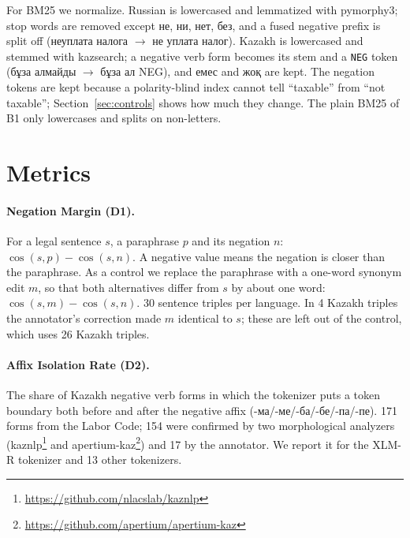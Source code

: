 \documentclass[11pt]{article}
\newcommand{\ru}[1]{#1}
\begin{document}
For BM25 we normalize. Russian is lowercased and lemmatized with pymorphy3; stop words are removed except
\ru{не, ни, нет, без}, and a fused negative prefix is split off (\ru{неуплата налога} $\rightarrow$ \ru{не уплата
налог}). Kazakh is lowercased and stemmed with kazsearch; a negative verb form becomes its stem and a \texttt{NEG}
token (\ru{бұза алмайды} $\rightarrow$ \ru{бұза ал NEG}), and \ru{емес} and \ru{жоқ} are kept. The negation
tokens are kept because a polarity-blind index cannot tell ``taxable'' from ``not taxable''; Section~\ref{sec:controls} shows how
much they change. The plain BM25 of B1 only lowercases and splits on non-letters.

\section{Metrics}

\paragraph{Negation Margin (D1).} For a legal sentence $s$, a paraphrase $p$ and its negation $n$:
$\cos(s,p) - \cos(s,n)$. A negative value means the negation is closer than the paraphrase. As a control we
replace the paraphrase with a one-word synonym edit $m$, so that both alternatives differ from $s$ by about
one word: $\cos(s,m) - \cos(s,n)$. 30 sentence triples per language. In 4 Kazakh triples the annotator's
correction made $m$ identical to $s$; these are left out of the control, which uses 26 Kazakh triples.

\paragraph{Affix Isolation Rate (D2).} The share of Kazakh negative verb forms in which the tokenizer puts a
token boundary both before and after the negative affix (\ru{-ма/-ме/-ба/-бе/-па/-пе}). 171 forms from the
Labor Code; 154 were confirmed by two morphological analyzers (kaznlp\footnote{\url{https://github.com/nlacslab/kaznlp}}
and apertium-kaz\footnote{\url{https://github.com/apertium/apertium-kaz}}) and 17 by the annotator. We report it for
the XLM-R tokenizer \citep{conneau-etal-2020-unsupervised} and 13 other tokenizers.
\end{document}
